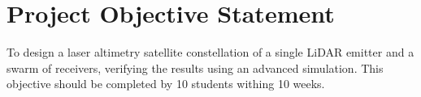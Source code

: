 \section{Project Objective Statement}
\label{dsePPPOS}
To design a laser altimetry satellite constellation of a single LiDAR emitter and a swarm of receivers, verifying the results using an advanced simulation. This objective should be completed by 10 students withing 10 weeks.